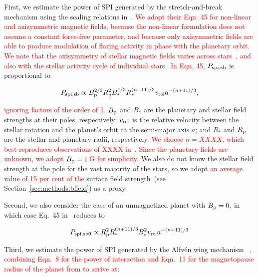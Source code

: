 \documentclass[twocolumn]{aastex631}
\begin{document}
First, we estimate the power of SPI generated by the stretch-and-break mechanism using the scaling relations in~\cite{lanza2012starplanet}. \textcolor{red}{We adopt their Eqn. 45 for non-linear and axisymmetric magnetic fields, because the non-linear formulation does not assume a constant force-free parameter, and because only axisymmetric fields are able to produce modulation of flaring activity in phase with the planetary orbit. We note that the axisymmetry of stellar magnetic fields varies across stars~\citep[e.g.,][]{donati2009magnetic, donati2008largescale, morin2008largescale, morin2010largescale}, and also with the stellar activity cycle of individual stars~\citep[e.g.,][]{borosaikia2016solarlike, lehmann2021identifying} In Eqn. 45,} $P_{\rm spi,sb}$ is proportional to

\begin{equation}
    P_{\rm spi,sb} \propto B_{\rm p}^{2/3} R_{\rm p}^2 B_*^{4/3} R_*^{(n+11) / 3} v_{\rm rel} a^{-(n+11) / 3},
\end{equation}

\textcolor{red}{ignoring factors of the order of 1.}  $B_{\rm p}$ and $B_*$ are the planetary and stellar field strengths at their poles, respectively; $v_{\rm rel}$ is the relative velocity between the stellar rotation and the planet's orbit at the semi-major axis $a$; and $R_*$ and $R_{\rm p}$ are the stellar and planetary radii, respectively. \textcolor{red}{We choose $n=XXXX$, which best reproduces observations of XXXX in~\citet{lanza2012starplanet}. Since the planetary fields are unknown, we adopt $B_{\rm p}=1\,$G for simplicity.} We also do not know the stellar field strength at the pole for the vast majority of the stars, so we adopt \textcolor{red}{an average value of 15 per cent of the} surface field strength~(see Section~\ref{sec:methods:bfield}) as a proxy.

Second, we also consider the case of an unmagnetized planet with $B_{\rm p}=0$, in which case Eq.~45 in~\cite{lanza2012starplanet} reduces to

\begin{equation}
    P_{\rm spi,sb0} \propto R_{\rm p}^2 R_*^{(n+11) / 3} B_*^2 v_{\rm rel}    a^{-(n+11) / 3} 
\end{equation}

Third, we estimate the power of SPI generated by the Alfv\'en wing mechanism ~\citep{saur2013magnetic,kavanagh2022radio}, \textcolor{red}{ combining Eqn.~8 for the power of interaction and Eqn.~11 for the magnetopause radius of the planet from\citet{kavanagh2022radio} to arrive at:}
\end{document}
